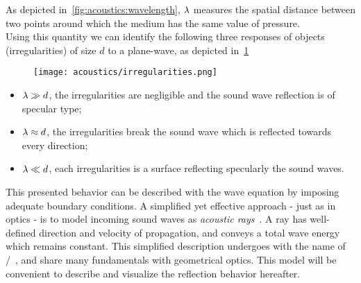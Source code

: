 As depicted in~\cref{fig:acoustics:wavelength}, $\lambda$ measures the spatial distance between two points around which the medium has the same value of pressure.
\\Using this quantity we can identify the following three responses of objects (irregularities) of size $d$ to a plane-wave, as depicted in~\cref{fig:acoustics:irregularities}
\begin{figure}
    \footnotesize
    \texttt{[image: acoustics/irregularities.png]}
    \label{fig:acoustics:irregularities}
\end{figure}
\begin{itemize}
    \item $\lambda \gg d$, the irregularities are negligible and the sound wave reflection is of specular type;
    \item $\lambda \approx d$, the irregularities break the sound wave which is reflected towards every direction;
    \item $\lambda \ll d$, each irregularities is a surface reflecting specularly the sound waves.
\end{itemize}

\mynewline
This presented behavior can be described with the wave equation by imposing adequate boundary conditions.
A simplified yet effective approach - just as in optics - is to model incoming sound waves as \textit{acoustic rays}~.
A ray has well-defined direction and velocity of propagation, and conveys a total wave energy which remains constant.
This simplified description undergoes with the name of \GAdef/~, and share many fundamentals with geometrical optics.
This model will be convenient to describe and visualize the reflection behavior hereafter.

